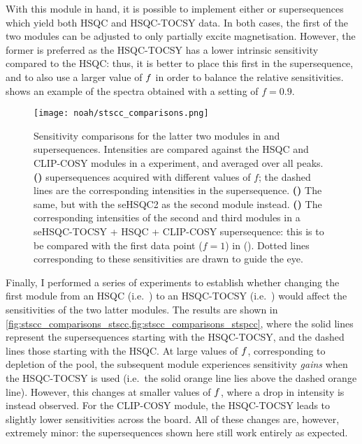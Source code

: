 With this module in hand, it is possible to implement either  or  supersequences which yield both HSQC and HSQC-TOCSY data.
In both cases, the first of the two \carbon{} modules can be adjusted to only partially excite  magnetisation.
However, the former is preferred as the HSQC-TOCSY has a lower intrinsic sensitivity compared to the HSQC: thus, it is better to place this first in the supersequence, and to also use a larger value of $f\/$ in order to balance the relative sensitivities.
 shows an example of the spectra obtained with a setting of $f = 0.9$.

\begin{figure}[!ht]
    \centering
    \texttt{[image: noah/stscc\_comparisons.png]}%
    {\label{fig:stscc_comparisons_stscc}}%
    {\label{fig:stscc_comparisons_stspcc}}%
    {\label{fig:stscc_comparisons_sehsqc_tocsy}}%
    \caption[Sensitivity comparisons for supersequences containing HSQC-TOCSY module]{
        Sensitivity comparisons for the latter two modules in  and  supersequences.
        Intensities are compared against the HSQC and CLIP-COSY modules in a  experiment, and averaged over all peaks.
        \textbf{()}  supersequences acquired with different values of $f$; the dashed lines are the corresponding intensities in the  supersequence.
        \textbf{()} The same, but with the seHSQC2 as the second module instead.
        \textbf{()} The corresponding intensities of the second and third modules in a seHSQC-TOCSY + HSQC + CLIP-COSY supersequence: this is to be compared with the first data point ($f = 1$) in ().
        Dotted lines corresponding to these sensitivities are drawn to guide the eye.
    }
    \label{fig:stscc_comparisons}
\end{figure}

Finally, I performed a series of experiments to establish whether changing the first module from an HSQC (i.e.\ ) to an HSQC-TOCSY (i.e.\ ) would affect the sensitivities of the two latter modules.
The results are shown in \cref{fig:stscc_comparisons_stscc,fig:stscc_comparisons_stspcc}, where the solid lines represent the supersequences starting with the HSQC-TOCSY, and the dashed lines those starting with the HSQC.
At large values of $f\/$, corresponding to depletion of the  pool, the subsequent \carbon{} module experiences sensitivity \textit{gains} when the HSQC-TOCSY is used (i.e.\ the solid orange line lies above the dashed orange line).
However, this changes at smaller values of $f\/$, where a drop in intensity is instead observed.
For the CLIP-COSY module, the HSQC-TOCSY leads to slightly lower sensitivities across the board.
All of these changes are, however, extremely minor: the supersequences shown here still work entirely as expected.


